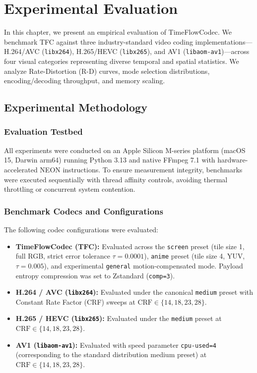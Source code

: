\chapter{Experimental Evaluation}
\label{chap:evaluation}

In this chapter, we present an empirical evaluation of TimeFlowCodec. We benchmark TFC against three industry-standard video coding implementations---H.264/AVC (\texttt{libx264}), H.265/HEVC (\texttt{libx265}), and AV1 (\texttt{libaom-av1})---across four visual categories representing diverse temporal and spatial statistics. We analyze Rate-Distortion (R-D) curves, mode selection distributions, encoding/decoding throughput, and memory scaling.

\section{Experimental Methodology}

\subsection{Evaluation Testbed}
All experiments were conducted on an Apple Silicon M-series platform (macOS 15, Darwin arm64) running Python 3.13 and native FFmpeg 7.1 with hardware-accelerated NEON instructions. To ensure measurement integrity, benchmarks were executed sequentially with thread affinity controls, avoiding thermal throttling or concurrent system contention.

\subsection{Benchmark Codecs and Configurations}
The following codec configurations were evaluated:
\begin{itemize}
    \item \textbf{TimeFlowCodec (TFC):} Evaluated across the \texttt{screen} preset (tile size 1, full RGB, strict error tolerance $\tau = 0.0001$), \texttt{anime} preset (tile size 4, YUV, $\tau = 0.005$), and experimental \texttt{general} motion-compensated mode. Payload entropy compression was set to Zstandard (\texttt{comp=3}).
    \item \textbf{H.264 / AVC (\texttt{libx264}):} Evaluated under the canonical \texttt{medium} preset with Constant Rate Factor (CRF) sweeps at $\text{CRF} \in \{14, 18, 23, 28\}$.
    \item \textbf{H.265 / HEVC (\texttt{libx265}):} Evaluated under the \texttt{medium} preset at $\text{CRF} \in \{14, 18, 23, 28\}$.
    \item \textbf{AV1 (\texttt{libaom-av1}):} Evaluated with speed parameter \texttt{cpu-used=4} (corresponding to the standard distribution medium preset) at $\text{CRF} \in \{14, 18, 23, 28\}$.
\end{itemize}

